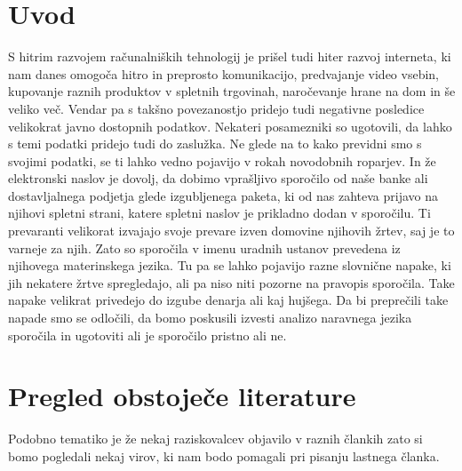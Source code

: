 \documentclass[sigconf,nonacm]{acmart}
\begin{document}
\maketitle

\section{Uvod}

S hitrim razvojem računalniških tehnologij je prišel tudi hiter razvoj interneta, ki nam danes omogoča hitro in preprosto komunikacijo, predvajanje video vsebin, kupovanje raznih produktov v spletnih trgovinah, naročevanje hrane na dom in še veliko več. Vendar pa s takšno povezanostjo pridejo tudi negativne posledice velikokrat javno dostopnih podatkov. Nekateri posamezniki so ugotovili, da lahko s temi podatki pridejo tudi do zaslužka. Ne glede na to kako previdni smo s svojimi podatki, se ti lahko vedno pojavijo v rokah novodobnih roparjev. In že elektronski naslov je dovolj, da dobimo vprašljivo sporočilo od naše banke ali dostavljalnega podjetja glede izgubljenega paketa, ki od nas zahteva prijavo na njihovi spletni strani, katere spletni naslov je prikladno dodan v sporočilu. Ti prevaranti velikorat izvajajo svoje prevare izven domovine njihovih žrtev, saj je to varneje za njih. Zato so sporočila v imenu uradnih ustanov prevedena iz njihovega materinskega jezika. Tu pa se lahko pojavijo razne slovnične napake, ki jih nekatere žrtve spregledajo, ali pa niso niti pozorne na pravopis sporočila. Take napake velikrat privedejo do izgube denarja ali kaj hujšega. Da bi preprečili take napade smo se odločili, da bomo poskusili izvesti analizo naravnega jezika sporočila in ugotoviti ali je sporočilo pristno ali ne.

\section{Pregled obstoječe literature}
Podobno tematiko je že nekaj raziskovalcev objavilo v raznih člankih zato si bomo pogledali nekaj virov, ki nam bodo pomagali pri pisanju lastnega članka.
\end{document}
